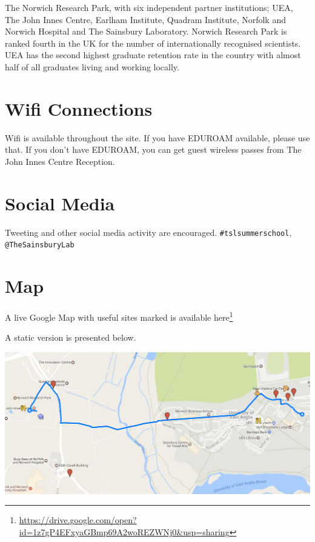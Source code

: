 \documentclass[12pt,]{book}
\let\rmarkdownfootnote\footnote%
\def\footnote{\protect\rmarkdownfootnote}
\renewcommand{\href}[2]{#2\footnote{\url{#1}}}
\theoremstyle{definition}
\theoremstyle{definition}
\theoremstyle{remark}
\begin{document}
The Norwich Research Park, with six independent partner institutions;
UEA, The John Innes Centre, Earlham Institute, Quadram Institute,
Norfolk and Norwich Hospital and The Sainsbury Laboratory. Norwich
Research Park is ranked fourth in the UK for the number of
internationally recognised scientists. UEA has the second highest
graduate retention rate in the country with almost half of all graduates
living and working locally.

\section*{Wifi Connections}\label{wifi-connections}

Wifi is available throughout the site. If you have EDUROAM available,
please use that. If you don't have EDUROAM, you can get guest wireless
passes from The John Innes Centre Reception.

\section*{Social Media}\label{social-media}

Tweeting and other social media activity are encouraged.
\texttt{\#tslsummerschool}, \texttt{@TheSainsburyLab}

\section*{Map}\label{map}

A live Google Map with useful sites marked is available
\href{https://drive.google.com/open?id=1z7gP4EFxyaGBmp69A2woREZWNj0\&usp=sharing}{here}

A static version is presented below.

\includegraphics[width=6.11in]{assets/large_map}
\end{document}
